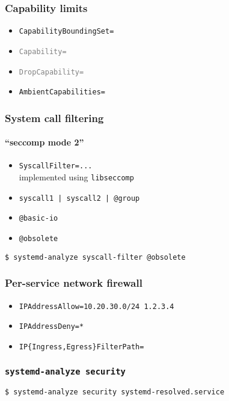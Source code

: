 \documentclass[serif]{beamer}
\begin{document}
\begin{frame}
  \frametitle{Capability limits}

  \begin{itemize}
  \item \texttt{CapabilityBoundingSet=}
  \item \texttt{\textcolor{gray}{Capability=}}
  \item \texttt{\textcolor{gray}{DropCapability=}}
  \item \texttt{AmbientCapabilities=}
  \end{itemize}
\end{frame}

\begin{frame}[fragile]
  \frametitle{System call filtering}
  \framesubtitle{``seccomp mode 2''}

  \pause

  \begin{itemize}
  \item \texttt{SyscallFilter=...}\\
        implemented using \texttt{libseccomp}
  \item \texttt{syscall1 | syscall2 | @group}
  \item \texttt{@basic-io}
  \item \texttt{@obsolete}
  \end{itemize}

  \medskip
  \pause

  \begin{verbatim}
$ systemd-analyze syscall-filter @obsolete
  \end{verbatim}
\end{frame}

\begin{frame}
  \frametitle{Per-service network firewall}

  \begin{itemize}
  \item \texttt{IPAddressAllow=\color{gray}10.20.30.0/24 1.2.3.4}
  \item \texttt{IPAddressDeny=\color{gray}*}
  \item \texttt{IP\{Ingress,Egress\}FilterPath=}
  \end{itemize}
\end{frame}

\begin{frame}[fragile]
  \frametitle{\texttt{systemd-analyze security}}

  \begin{verbatim}
$ systemd-analyze security systemd-resolved.service
  \end{verbatim}
\end{frame}
\end{document}
